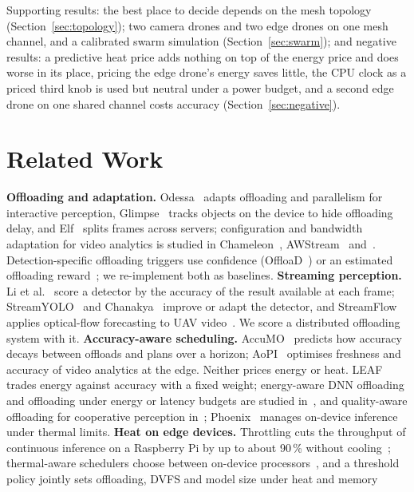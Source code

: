 \documentclass[conference]{IEEEtran}
\begin{document}
Supporting results: the best place to decide depends on the mesh topology (Section~\ref{sec:topology}); two camera
drones and two edge drones on one mesh channel, and a calibrated swarm simulation (Section~\ref{sec:swarm}); and negative
results: a predictive heat price adds nothing on top of the energy price and does worse in its place, pricing the edge
drone's energy saves little, the CPU clock as a priced third knob is used but neutral under a power budget, and a second
edge drone on one shared channel costs accuracy (Section~\ref{sec:negative}).

\section{Related Work}
\textbf{Offloading and adaptation.} Odessa~\cite{Ra_2011} adapts offloading and parallelism for interactive perception,
Glimpse~\cite{Chen_2015} tracks objects on the device to hide offloading delay, and Elf~\cite{Zhang_2021} splits frames
across servers; configuration and bandwidth adaptation for video analytics is studied in Chameleon~\cite{Jiang_2018},
AWStream~\cite{Zhang_2018} and~\cite{Zhang_2022,Du_2020}.
Detection-specific offloading triggers use confidence (OffloaD~\cite{Gomez_2024}) or an estimated offloading
reward~\cite{Qiu_2024}; we re-implement both as baselines.
\textbf{Streaming perception.} Li et al.~\cite{Li_2020} score a detector by the accuracy of the result available at
each frame; StreamYOLO~\cite{Yang_2022} and Chanakya~\cite{Ghosh_2023} improve or adapt the detector, and StreamFlow
applies optical-flow forecasting to UAV video~\cite{Wang_2025}. We score a distributed offloading system with it.
\textbf{Accuracy-aware scheduling.} AccuMO~\cite{Kong_2023} predicts how accuracy decays between offloads and plans over
a horizon; AoPI~\cite{Li_2024} optimises freshness and accuracy of video analytics at the edge. Neither prices energy
or heat. LEAF~\cite{Wang_2023} trades energy against accuracy with a fixed weight; energy-aware DNN offloading and offloading
under energy or latency budgets are studied in~\cite{Xu_2021,Jiang_2023,Younis_2024}, and quality-aware offloading for
cooperative perception in~\cite{Zaki_2024}; Phoenix~\cite{Jeon_2026} manages on-device inference under thermal limits.
\textbf{Heat on edge devices.} Throttling cuts the throughput of continuous inference on a Raspberry Pi by up to
about 90\,\% without cooling~\cite{BenoitCattin_2020}; thermal-aware schedulers choose between on-device
processors~\cite{Tan_2024}, and a threshold policy jointly sets offloading, DVFS and model size under heat and memory
\end{document}
